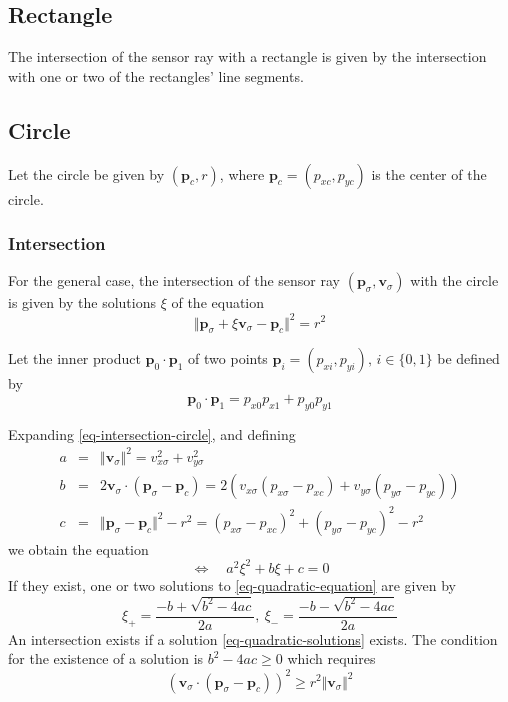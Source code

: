 \documentclass[11pt]{article}
\newcommand{\pb}{\mathbf{p}}
\newcommand{\pbc}{\mathbf{p}_c}
\newcommand{\pbsig}{\mathbf{p}_\sigma}
\newcommand{\pxc}{p_{xc}}
\newcommand{\pyc}{p_{yc}}
\newcommand{\pxsig}{p_{x\sigma}}
\newcommand{\pysig}{p_{y\sigma}}
\newcommand{\vbsig}{\mathbf{v}_\sigma}
\newcommand{\vxsig}{v_{x\sigma}}
\newcommand{\vysig}{v_{y\sigma}}
\begin{document}
\subsection{Rectangle}
\label{sec-intersection-rectangle}

The intersection of the sensor ray with a rectangle is given by the
intersection with one or two of the rectangles' line segments.

\subsection{Circle}
\label{sec-intersection-circle}
Let the circle be given by $(\pbc, r)$, where $\pbc=(\pxc, \pyc)$ is the
center of the circle.

\subsubsection*{Intersection}
For the general case, the intersection of the sensor ray $(\pbsig, \vbsig)$
with the circle is given by the solutions $\xi$ of the equation
\begin{equation}
    \Vert\pbsig + \xi\vbsig - \pbc\Vert^2 = r^2\label{eq-intersection-circle}
\end{equation}

Let the inner product $\pb_0\cdot\pb_1$ of two points
$\pb_i=(p_{xi},p_{yi}),\,i\in\{0,1\}$ be defined by
\begin{equation}
    \pb_0\cdot\pb_1 = p_{x0}p_{x1} + p_{y0}p_{y1}
\end{equation}

Expanding \eqref{eq-intersection-circle}, and defining
\begin{eqnarray}
    a &=& \Vert\vbsig\Vert^2 = \vxsig^2+\vysig^2 \\
    b &=& 2\vbsig\cdot(\pbsig-\pbc) =
        2(\vxsig(\pxsig-\pxc)+\vysig(\pysig-\pyc)) \\
    c &=& \Vert\pbsig-\pbc\Vert^2 - r^2 =
        (\pxsig-\pxc)^2 + (\pysig-\pyc)^2 - r^2
\end{eqnarray}
we obtain the equation
\begin{equation}
    \Leftrightarrow\quad a^2\xi^2 + b\xi + c = 0\label{eq-quadratic-equation}
\end{equation}
If they exist, one or two solutions to \eqref{eq-quadratic-equation} are
given by
\begin{equation}
    \xi_+ = \frac{-b+\sqrt{b^2-4ac}}{2a},\:
    \xi_- = \frac{-b-\sqrt{b^2-4ac}}{2a}\label{eq-quadratic-solutions}
\end{equation}
An intersection exists if a solution \eqref{eq-quadratic-solutions} exists. The
condition for the existence of a solution is $b^2-4ac\geq0$ which requires
\begin{equation}
    (\vbsig\cdot(\pbsig-\pbc))^2 \geq r^2 \Vert\vbsig\Vert^2
    \label{eq-condition-intersection-circle}
\end{equation}
\end{document}
